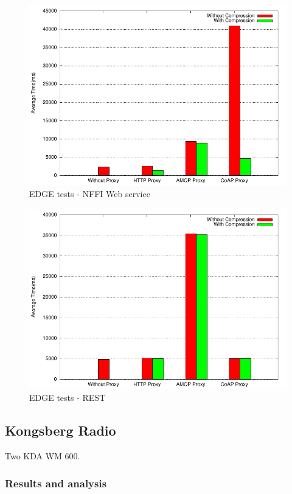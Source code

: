 \begin{figure}[H]
\center
\includegraphics[scale=0.75]{../results/edge/nffi/result.pdf}
\caption{EDGE tests - NFFI Web service}
\end{figure}

\begin{figure}[H]
\center
\includegraphics[scale=0.75]{../results/edge/rest/result.pdf}
\caption{EDGE  tests - REST}
\end{figure}

\subsection{Kongsberg Radio}

Two KDA WM 600.


\subsubsection{Results and analysis}

